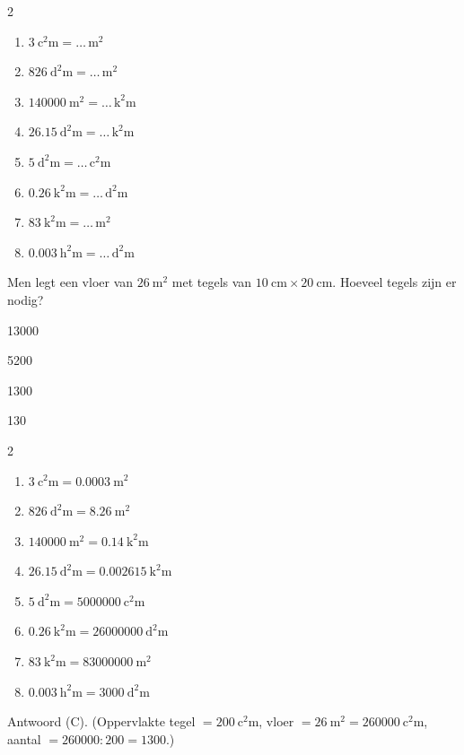 \documentclass{bis}
\begin{document}
\begin{exercise}
\begin{multicols}{2}
\begin{enumerate}
  \item \(\SI{3}{\square\centi\metre}=\ldots\,\si{\square\metre}\)
  \item \(\SI{826}{\square\deci\metre}=\ldots\,\si{\square\metre}\)
  \item \(\SI{140000}{\square\metre}=\ldots\,\si{\square\kilo\metre}\)
  \item \(\SI{26.15}{\square\deca\metre}=\ldots\,\si{\square\kilo\metre}\)
  \item \(\SI{5}{\square\deca\metre}=\ldots\,\si{\square\centi\metre}\)
  \item \(\SI{0.26}{\square\kilo\metre}=\ldots\,\si{\square\deci\metre}\)
  \item \(\SI{83}{\square\kilo\metre}=\ldots\,\si{\square\metre}\)
  \item \(\SI{0.003}{\square\hecto\metre}=\ldots\,\si{\square\deci\metre}\)
\end{enumerate}
\end{multicols}

Men legt een vloer van \(\SI{26}{\square\metre}\) met tegels van \(\SI{10}{\centi\metre}\times\SI{20}{\centi\metre}\). Hoeveel tegels zijn er nodig?
\begin{meerkeuze}
  \item \num{13000}
  \item \num{5200}
  \item \num{1300}
  \item \num{130}
\end{meerkeuze}
\end{exercise}

\begin{solution}
\begin{multicols}{2}
\begin{enumerate}
  \item \(\SI{3}{\square\centi\metre}=\SI{0.0003}{\square\metre}\)
  \item \(\SI{826}{\square\deci\metre}=\SI{8.26}{\square\metre}\)
  \item \(\SI{140000}{\square\metre}=\SI{0.14}{\square\kilo\metre}\)
  \item \(\SI{26.15}{\square\deca\metre}=\SI{0.002615}{\square\kilo\metre}\)
  \item \(\SI{5}{\square\deca\metre}=\SI{5000000}{\square\centi\metre}\)
  \item \(\SI{0.26}{\square\kilo\metre}=\SI{26000000}{\square\deci\metre}\)
  \item \(\SI{83}{\square\kilo\metre}=\SI{83000000}{\square\metre}\)
  \item \(\SI{0.003}{\square\hecto\metre}=\SI{3000}{\square\deci\metre}\)
\end{enumerate}
\end{multicols}
Antwoord (C). (Oppervlakte tegel \(=\SI{200}{\square\centi\metre}\), vloer \(=\SI{26}{\square\metre}=\SI{260000}{\square\centi\metre}\), aantal \(=\num{260000}:\num{200}=\num{1300}\).)
\end{solution}
\end{document}
